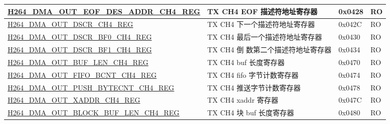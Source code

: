 \begin{longtable}{ | p{7.5cm} | p{5.7cm} | p{1.2cm} | p{1.5cm} | }
    \hyperref[regdesc:H264DMAOUTEOFDESADDRCH4REG]{H264\_DMA\_OUT\_EOF\_DES\_ADDR\_CH4\_REG} & TX CH4 EOF 描述符地址寄存器 & 0x0428 & RO \\ \hline
    \hyperref[regdesc:H264DMAOUTDSCRCH4REG]{H264\_DMA\_OUT\_DSCR\_CH4\_REG} & TX CH4 下一个描述符地址寄存器 & 0x042C & RO \\ \hline
    \hyperref[regdesc:H264DMAOUTDSCRBF0CH4REG]{H264\_DMA\_OUT\_DSCR\_BF0\_CH4\_REG} & TX CH4 最后一个描述符地址寄存器 & 0x0430 & RO \\ \hline
    \hyperref[regdesc:H264DMAOUTDSCRBF1CH4REG]{H264\_DMA\_OUT\_DSCR\_BF1\_CH4\_REG} & TX CH4 倒 数第二个描述符地址寄存器 & 0x0434 & RO \\ \hline
    \hyperref[regdesc:H264DMAOUTBUFLENCH4REG]{H264\_DMA\_OUT\_BUF\_LEN\_CH4\_REG} & TX CH4 buf 长度寄存器 & 0x0470 & RO \\ \hline
    \hyperref[regdesc:H264DMAOUTFIFOBCNTCH4REG]{H264\_DMA\_OUT\_FIFO\_BCNT\_CH4\_REG} & TX CH4 fifo 字节计数寄存器 & 0x0474 & RO \\ \hline
    \hyperref[regdesc:H264DMAOUTPUSHBYTECNTCH4REG]{H264\_DMA\_OUT\_PUSH\_BYTECNT\_CH4\_REG} & TX CH4 推送字节计数寄存器 & 0x0478 & RO \\ \hline
    \hyperref[regdesc:H264DMAOUTXADDRCH4REG]{H264\_DMA\_OUT\_XADDR\_CH4\_REG} & TX CH4 xaddr 寄存器 & 0x047C & RO \\ \hline
    \hyperref[regdesc:H264DMAOUTBLOCKBUFLENCH4REG]{H264\_DMA\_OUT\_BLOCK\_BUF\_LEN\_CH4\_REG} & TX CH4 块 buf 长度寄存器 & 0x0480 & RO \\ \hline


\end{longtable}
